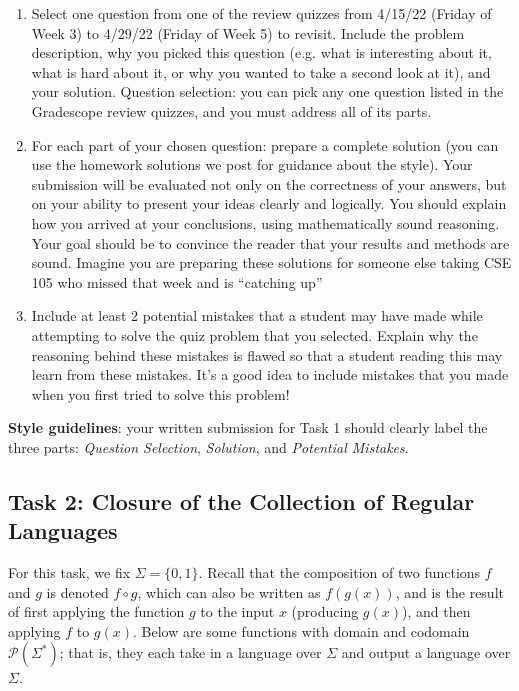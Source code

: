 \documentclass[12pt, oneside]{article}
\begin{document}
	\begin{enumerate}
		\item Select one question from one of the review quizzes from 4/15/22 (Friday of Week 3) to 4/29/22  (Friday of Week 5) to revisit. Include the problem description, why you picked this question (e.g. what is interesting about it, what is hard about it, or why you wanted to take a second look at it), and your solution. Question selection: you can pick any one question listed in the Gradescope review quizzes, and you must address  all  of its parts. 
 		\item For each part of your chosen question: prepare a complete solution (you can use the homework solutions we post for guidance about the style). Your submission will be evaluated not only on the correctness of your answers, but on your ability to present your ideas clearly and logically. You should explain how you arrived at your conclusions, using mathematically sound reasoning. Your goal should be to convince the reader that your results and methods are sound. Imagine you are preparing these solutions for someone else taking CSE 105 who missed that week and is “catching up”
 
 		\item Include at least 2 potential mistakes that a student may have made while attempting to solve the quiz problem that you selected. Explain why the reasoning behind these mistakes is flawed so that a student reading this may learn from these mistakes. It’s a good idea to include mistakes that you made when you first tried to solve this problem!	
	\end{enumerate}
	
	{\bf Style guidelines}: your written submission for Task 1 should clearly label the three parts:
	{\it Question Selection}, {\it Solution},  and {\it Potential Mistakes}.

\newpage
\subsection{Task 2: Closure of the Collection of Regular Languages}
	
	For this task, we fix $\Sigma = \{0,1\}$. Recall that the composition of two 
	functions $f$ and $g$ is denoted $f \circ g$, which can also be written as $f(g(x))$, and is the 
	result of first applying the function $g$ to the input $x$ (producing $g(x)$), and then applying $f$ to $g(x)$. 
	Below are some functions with domain and codomain $\mathcal{P}(\Sigma^*)$; that is, they 
	each take in a language over $\Sigma$
	and output a language over $\Sigma$. 
	
\end{document}
